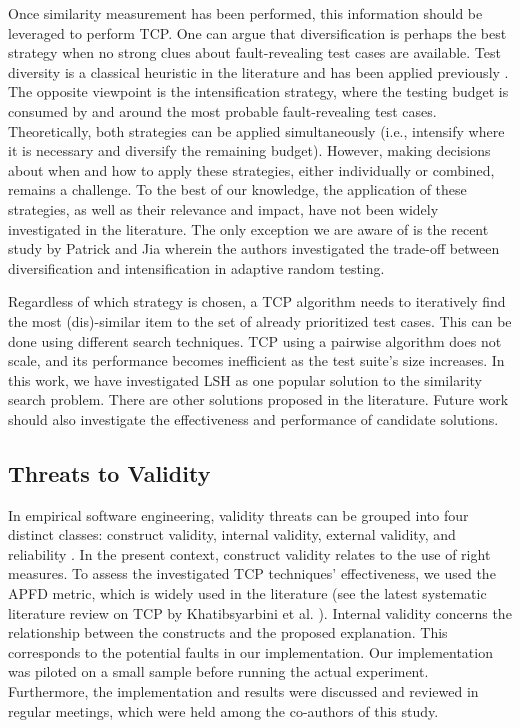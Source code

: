 \documentclass[runningheads]{llncs}
\begin{document}
Once similarity measurement has been performed, this information should be leveraged to perform TCP. One can argue that diversification is perhaps the best strategy when no strong clues about fault-revealing test cases are available. Test diversity is a classical heuristic in the literature and has been applied previously \cite{jiang2009adaptive,hemmati2010reducing,ledru2012prioritizing,hemmati2013achieving,hemmati2017prioritizing,arafeen2013test,thomas2014static,feldt2016test,flemstrom2017similarity}. The opposite viewpoint is the intensification strategy, where the testing budget is consumed by and around the most probable fault-revealing test cases. Theoretically, both strategies can be applied simultaneously (i.e., intensify where it is necessary and diversify the remaining budget). However, making decisions about when and how to apply these strategies, either individually or combined, remains a challenge. To the best of our knowledge, the application of these strategies, as well as their relevance and impact, have not been widely investigated in the literature. The only exception we are aware of is the recent study by Patrick and Jia \cite{patrick2017kd} wherein the authors investigated the trade-off between diversification and intensification in adaptive random testing.

Regardless of which strategy is chosen, a TCP algorithm needs to iteratively find the most (dis)-similar item to the set of already prioritized test cases. This can be done using different search techniques. TCP using a pairwise algorithm does not scale, and its performance becomes inefficient as the test suite's size increases. In this work, we have investigated LSH as one popular solution to the similarity search problem. There are other solutions proposed in the literature. Future work should also investigate the effectiveness and performance of candidate solutions.


\subsection{Threats to Validity}
In empirical software engineering, validity threats can be grouped into four distinct classes: construct validity, internal validity, external validity, and reliability \cite{wohlin2000experimentation}. In the present context, construct validity relates to the use of right measures. To assess the investigated TCP techniques' effectiveness, we used the APFD metric, which is widely used in the literature (see the latest systematic literature review on TCP by Khatibsyarbini et al. \cite{khatibsyarbini2017test}). Internal validity concerns the relationship between the constructs and the proposed explanation. This corresponds to the potential faults in our implementation. Our implementation was piloted on a small sample before running the actual experiment. Furthermore, the implementation and results were discussed and reviewed in regular meetings, which were held among the co-authors of this study. 
\end{document}
